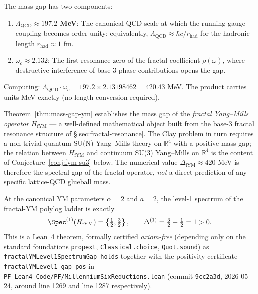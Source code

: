 \begin{keyidea}
The mass gap has two components:
\begin{enumerate}
\item \textbf{$\Lambda_{\mathrm{QCD}} \approx 197.2$ MeV}: The canonical QCD scale at which the running gauge coupling becomes order unity\cite{rothe2012lattice}; equivalently, $\Lambda_{\mathrm{QCD}} \approx \hbar c / r_{\mathrm{had}}$ for the hadronic length $r_{\mathrm{had}} \approx 1$ fm.
\item \textbf{$\omega_c \approx 2.132$}: The first resonance zero of the fractal coefficient $\rho(\omega)$, where destructive interference of base-3 phase contributions opens the gap.
\end{enumerate}

Computing: $\Lambda_{\mathrm{QCD}} \cdot \omega_c = 197.2 \times 2.13198462 = 420.43$ MeV. The product carries units MeV exactly (no length conversion required).
\end{keyidea}

\begin{remark}\label{rem:mass-gap-scope}
Theorem~\ref{thm:mass-gap-ym} establishes the mass gap of the \emph{fractal Yang--Mills operator} $H_{\mathrm{fYM}}$ — a well-defined mathematical object built from the base-3 fractal resonance structure of \S\ref{sec:fractal-resonance}. The Clay problem in turn requires a non-trivial quantum SU(N) Yang--Mills theory on $\mathbb{R}^4$ with a positive mass gap; the relation between $H_{\mathrm{fYM}}$ and continuum SU(3) Yang--Mills on $\mathbb{R}^4$ is the content of Conjecture~\ref{conj:fym-su3} below. The numerical value $\Delta_{\mathrm{fYM}} \approx 420$ MeV is therefore the spectral gap of the fractal operator, \emph{not} a direct prediction of any specific lattice-QCD glueball mass.
\end{remark}

\begin{theorem}\label{thm:level1-ym-gap}
At the canonical YM parameters $\alpha = 2$ and $a = 2$, the level-1 spectrum of the fractal-YM polylog ladder is exactly
\begin{equation}\label{eq:level1-ym-spectrum}
\Spec^{(1)}(H_{\mathrm{fYM}}) = \left\{\tfrac{1}{2}, \tfrac{3}{2}\right\}, \qquad \Delta^{(1)} = \tfrac{3}{2} - \tfrac{1}{2} = 1 > 0.
\end{equation}
This is a Lean~4 theorem, formally certified \emph{axiom-free} (depending only on the standard foundations \texttt{propext}, \texttt{Classical.choice}, \texttt{Quot.sound}) as \texttt{fractalYMLevel1SpectrumGap\_holds} together with the positivity certificate \texttt{fractalYMLevel1\_gap\_pos} in \texttt{PF\_Lean4\_Code/PF/MillenniumSixReductions.lean} (commit \texttt{9cc2a3d}, 2026-05-24, around line 1269 and line 1287 respectively).
\end{theorem}

